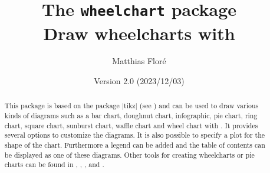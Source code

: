 \documentclass[a4paper,english,dvipsnames]{ltxdoc}
\title{The \texttt{wheelchart} package\\[12pt]\large Draw wheelcharts with \tikzname}
\author{Matthias Flor\'e}
\date{Version 2.0 (2023/12/03)}%
\begin{document}
\iftotalpages%
\newsavebox{\fancyfootdefaultbox}%
\begin{lrbox}{\fancyfootdefaultbox}%
\end{lrbox}%
\fi%
\maketitle
\thispagestyle{fancy}
\begin{abstract}
\noindent This package is based on the package |tikz| (see \cite{TtTaPGFp}) and can be used to draw various kinds of diagrams such as a bar chart, doughnut chart, infographic, pie chart, ring chart, square chart, sunburst chart, waffle chart and wheel chart with \tikzname. It provides several options to customize the diagrams. It is also possible to specify a plot for the shape of the chart. Furthermore a legend can be added and the table of contents can be displayed as one of these diagrams. Other tools for creating wheelcharts or pie charts can be found in \cite{MpMP}, \cite{JhcIparowcltopotPGFm}, \cite{Tumfdb}, \cite{XdPCbupp} and \cite{RSVpaaMfp}.%
\end{abstract}
\end{document}
